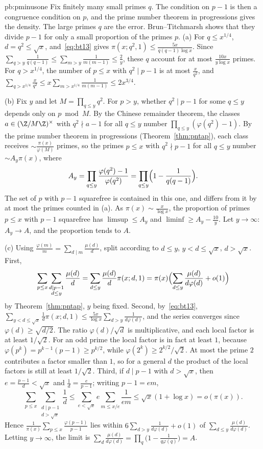 \begin{solution}{pb:pminusone}
\idea Fix finitely many small primes $q$. The condition on $p-1$ is then a congruence condition on $p$, and the prime number theorem in progressions gives the density. The large primes $q$ are the error. Brun--Titchmarsh shows that they divide $p-1$ for only a small proportion of the primes $p$.
\writeup (a) For $q\le x^{1/4}$, $d=q^2\le\sqrt x$, and~\eqref{eq:bt13} gives $\pi(x;q^2,1)\le\frac{5x}{q(q-1)\log x}$. Since $\sum_{q>y}\frac1{q(q-1)}\le\sum_{m>y}\frac1{m(m-1)}\le\frac2y$, these $q$
account for at most $\frac{10x}{y\log x}$ primes. For $q>x^{1/4}$, the number of $p\le x$ with $q^2\mid p-1$ is at most $\frac x{q^2}$, and
$\sum_{q>x^{1/4}}\frac x{q^2}\le x\sum_{m>x^{1/4}}\frac1{m(m-1)}\le2x^{3/4}$.

(b) Fix $y$ and let $M=\prod_{q\le y}q^2$. For $p>y$, whether $q^2\mid p-1$ for some $q\le y$ depends only on $p\bmod M$. By the Chinese remainder theorem, the classes
$a\in(\Z/M\Z)^\times$ with $q^2\nmid a-1$ for all $q\le y$ number $\prod_{q\le y}(\varphi(q^2)-1)$. By the prime number theorem in progressions (Theorem~\ref{thm:pntap}), each class
receives $\sim\frac{\pi(x)}{\varphi(M)}$ primes, so the primes $p\le x$ with $q^2\nmid p-1$ for all $q\le y$ number $\sim A_y\pi(x)$, where
\[
A_y=\prod_{q\le y}\frac{\varphi(q^2)-1}{\varphi(q^2)}=\prod_{q\le y}\Bigl(1-\frac1{q(q-1)}\Bigr).
\]
The set of $p$ with $p-1$ squarefree is contained in this one, and differs from it by at most the primes counted in (a). As $\pi(x)\sim\frac x{\log x}$, the proportion of
primes $p\le x$ with $p-1$ squarefree has $\limsup\le A_y$ and $\liminf\ge A_y-\frac{10}y$. Let $y\to\infty$: $A_y\to A$, and the proportion tends to $A$.

(c) Using $\frac{\varphi(m)}m=\sum_{d\mid m}\frac{\mu(d)}d$, split according to $d\le y$, $y<d\le\sqrt x$, $d>\sqrt x$. First,
\[
\sum_{p\le x}\sum_{\substack{d\mid p-1\\d\le y}}\frac{\mu(d)}d=\sum_{d\le y}\frac{\mu(d)}d\pi(x;d,1)=\pi(x)\Bigl(\sum_{d\le y}\frac{\mu(d)}{d\varphi(d)}+o(1)\Bigr)
\]
by Theorem~\ref{thm:pntap}, $y$ being fixed. Second, by~\eqref{eq:bt13},
$\sum_{y<d\le\sqrt x}\frac1d\pi(x;d,1)\le\frac{5x}{\log x}\sum_{d>y}\frac1{d\varphi(d)}$, and the series converges since $\varphi(d)\ge\sqrt{d/2}$. The ratio $\varphi(d)/\sqrt d$ is multiplicative, and each local factor is at least $1/\sqrt2$. For an odd prime the local factor is in fact at least $1$, because $\varphi(p^k)=p^{k-1}(p-1)\ge p^{k/2}$, while $\varphi(2^k)\ge2^{k/2}/\sqrt2$. At most the prime $2$ contributes a factor smaller than $1$, so for a general $d$ the product of the local factors is still at least $1/\sqrt2$. Third, if $d\mid p-1$ with $d>\sqrt x$, then $e=\frac{p-1}d<\sqrt x$ and $\frac1d=\frac e{p-1}$; writing $p-1=em$,
\[
\sum_{p\le x}\sum_{\substack{d\mid p-1\\d>\sqrt x}}\frac1d\le\sum_{e<\sqrt x}e\sum_{m\le x/e}\frac1{em}\le\sqrt x(1+\log x)=o(\pi(x)).
\]
Hence $\frac1{\pi(x)}\sum_{p\le x}\frac{\varphi(p-1)}{p-1}$ lies within $6\sum_{d>y}\frac1{d\varphi(d)}+o(1)$ of $\sum_{d\le y}\frac{\mu(d)}{d\varphi(d)}$. Letting $y\to\infty$, the
limit is $\sum_d\frac{\mu(d)}{d\varphi(d)}=\prod_q\bigl(1-\frac1{q\varphi(q)}\bigr)=A$.


\end{solution}
